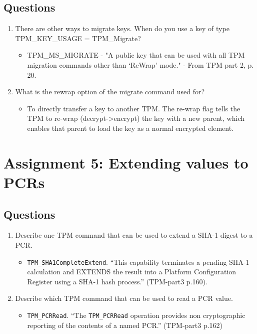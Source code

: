 \documentclass[10pt]{article}
\begin{document}
\subsection{Questions}
\begin{enumerate}
    \item {There are other ways to migrate keys. When do you use a key of type TPM\_KEY\_USAGE = TPM\_Migrate? }
	\begin{itemize}
        \item { TPM\_MS\_MIGRATE - "A public key that can be used with all TPM 
        migration commands other than ‘ReWrap’ mode." - From TPM part 2, p. 20.} 
	\end{itemize}
    \item {What is the rewrap option of the migrate command used for? }
	\begin{itemize}
        \item {To directly transfer a key to another TPM. The re-wrap flag tells the TPM
        to re-wrap (decrypt->encrypt) the key with a new parent, which enables that parent
        to load the key as a normal encrypted element.}
	\end{itemize}
\end{enumerate}

\section{Assignment 5: Extending values to PCRs}
\subsection{Questions}
\begin{enumerate}
    \item {Describe one TPM command that can be used to extend a SHA-1 digest to a PCR.}
    \begin{itemize}
        \item {\texttt{TPM\_SHA1CompleteExtend}. “This capability terminates a pending SHA-1 calculation
        and EXTENDS the result into a Platform Configuration Register using
        a SHA-1 hash process.” (TPM-part3 p.160).}
    \end{itemize}
    \item {Describe which TPM command that can be used to read a PCR value.}
    \begin{itemize}
        \item {\texttt{TPM\_PCRRead}. “The \texttt{TPM\_PCRRead} operation provides non cryptographic reporting
        of the contents of a named PCR.” (TPM-part3 p.162)}
    \end{itemize}
\end{enumerate}
\end{document}
